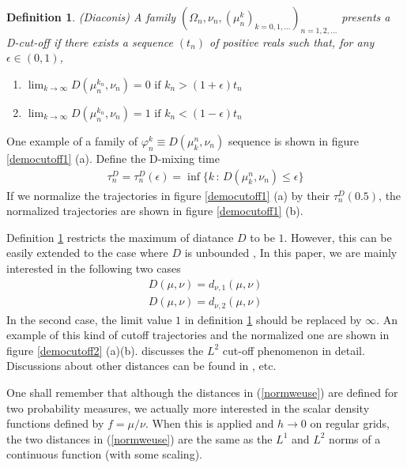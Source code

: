 \documentclass{article}
\newtheorem{definition}{Definition}
\begin{document}
\begin{definition}
\label{cutoffdefition}
(Diaconis) A family $(\Omega_n,\nu_n, (\mu^k_n)_{k=0,1,...})_{n=1,2,...}$
presents a D-cut-off if there exists a sequence $(t_n)$ of positive
reals such that, for any $\epsilon \in(0,1)$,
\begin{enumerate}
  \item $\lim_{k \rightarrow \infty}D(\mu^{k_n}_n,\nu_n) = 0 \mbox{ if }
  k_n>(1+\epsilon)t_n$
  \item $\lim_{k \rightarrow \infty}D(\mu^{k_n}_n,\nu_n) = 1 \mbox{ if }
  k_n<(1-\epsilon)t_n $
\end{enumerate}
\end{definition}

One example of a family of $\varphi^k_n \equiv D(\mu_k^n,\nu_n)$ sequence
is shown in figure \ref{democutoff1} (a). Define the D-mixing time
\begin{eqnarray}
\label{Dmixingtime}
\tau^D_n=\tau^D_n(\epsilon) = \inf\{k\,:\,D(\mu_k^n,\nu_n) \le \epsilon\}
\end{eqnarray}
If we normalize the trajectories in figure \ref{democutoff1} (a) by their $\tau_n^D(0.5)$, the
normalized trajectories are shown in figure \ref{democutoff1} (b).


Definition \ref{cutoffdefition} restricts the maximum of diatance $D$ to be $1$.
However, this can be easily extended to the case where $D$ is unbounded \cite{Diaconis2005},
In this paper, we are mainly interested in the following two cases
\begin{eqnarray}
\label{normweuse}
 D(\mu,\nu) = d_{\nu,1}(\mu,\nu)\\ 
 D(\mu,\nu) = d_{\nu,2}(\mu,\nu)\nonumber
\end{eqnarray}
In the second case, the limit value $1$ in definition \ref{cutoffdefition} should be replaced by $\infty$.
An example of this kind of cutoff trajectories and the normalized one are shown in figure \ref{democutoff2} (a)(b). \cite{Chen2006} discusses the
$L^2$ cut-off phenomenon in detail. Discussions about other distances can be found in \cite{Diaconis2005}\cite{Chen2006}\cite{LSaloff-Costt1997}, etc.


One shall remember that although the distances in (\ref{normweuse}) are defined for two probability measures, we actually more interested in the scalar density functions defined by $f =\mu / \nu $. When this is applied and $h \rightarrow 0$ on regular grids, the two distances in (\ref{normweuse}) are the same as the $L^1$ and $L^2$ norms of a continuous function (with some scaling).  
\end{document}
